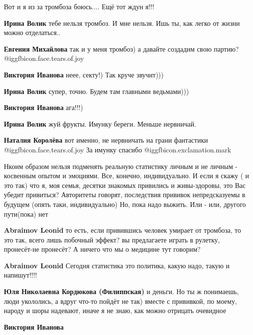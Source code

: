 \begin{itemize}
Вот и я из за тромбоза боюсь.... Ещё тот ждун я!!!

\begin{itemize} %
\textbf{Ирина Волик} тебе нельзя тромбоз. И мне нельзя. Ишь ты, как легко от жизни можно отделаться..

\textbf{Евгения Михайлова} так и у меня тромбоз) а давайте создадим свою партию?  @igg{fbicon.face.tears.of.joy} 

\textbf{Виктория Иванова} неее, секту!) Так круче звучит)))

\textbf{Ирина Волик} супер, точно. Будем там главными ведьмами)))

\textbf{Виктория Иванова} ага!!!)

\textbf{Ирина Волик} жуй фрукты. Имунку береги. Меньше нервничай.

\textbf{Наталия Королёва} вот именно, не нервничать на грани фантастики @igg{fbicon.face.tears.of.joy}  За имунку спасибо
@igg{fbicon.exclamation.mark}
\end{itemize} %


Нкоим образом нельзя подменять реальную статистику личным и не личным -
косвенным опытом и эмоциями. Все, конечно, индивидуально. И если я скажу ( и
это так) что я, моя семья, десятки знакомых привились и живы-здоровы, это Вас
убедит привиться? Авторитеты говорят, последствия прививок непредсказуемы в
будущем (опять таки, индивидуально) Но, пока надо выжить. Или - или, другого
пути(пока) нет

\begin{itemize} %
\textbf{Abraimov Leonid} то есть, если привившись человек умирает от тромбоза, то это так, всего лишь побочный эффект? вы предлагаете играть в рулетку, пронесёт-не пронесёт? А ничего что мы о медицине тут говорим?

\textbf{Abraimov Leonid} Сегодня статистика это политика, какую надо, такую и напишут!!!!

\textbf{Юля Николаевна Кордюкова (Филиппская)} и деньги. Но ты ж понимаешь, люди укололись, а вдруг что-то пойдёт не так) вместе с прививкой, по моему, народу и шоры надевают, иначе я не знаю, как можно отрицать очевидное

\textbf{Виктория Иванова} 


\end{itemize}
\end{itemize}

